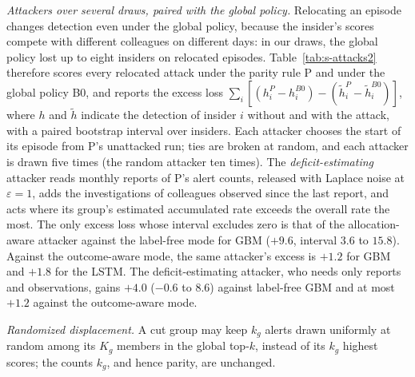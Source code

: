 \documentclass[10pt,onecolumn,letterpaper]{article}
\begin{document}
\emph{Attackers over several draws, paired with the global policy.} Relocating an episode changes detection even under the global policy, because the insider's scores compete with different colleagues on different days: in our draws, the global policy lost up to eight insiders on relocated episodes. Table~\ref{tab:s-attacks2} therefore scores every relocated attack under the parity rule P and under the global policy B0, and reports the excess loss $\sum_i[(h^{P}_{i}-h^{B0}_{i})-(\tilde h^{P}_{i}-\tilde h^{B0}_{i})]$, where $h$ and $\tilde h$ indicate the detection of insider $i$ without and with the attack, with a paired bootstrap interval over insiders. Each attacker chooses the start of its episode from P's unattacked run; ties are broken at random, and each attacker is drawn five times (the random attacker ten times). The \emph{deficit-estimating} attacker reads monthly reports of P's alert counts, released with Laplace noise at $\varepsilon=1$, adds the investigations of colleagues observed since the last report, and acts where its group's estimated accumulated rate exceeds the overall rate the most. The only excess loss whose interval excludes zero is that of the allocation-aware attacker against the label-free mode for GBM ($+9.6$, interval $3.6$ to $15.8$). Against the outcome-aware mode, the same attacker's excess is $+1.2$ for GBM and $+1.8$ for the LSTM. The deficit-estimating attacker, who needs only reports and observations, gains $+4.0$ ($-0.6$ to $8.6$) against label-free GBM and at most $+1.2$ against the outcome-aware mode.

\emph{Randomized displacement.} A cut group may keep $k_g$ alerts drawn uniformly at random among its $K_g$ members in the global top-$k$, instead of its $k_g$ highest scores; the counts $k_g$, and hence parity, are unchanged.
\end{document}

